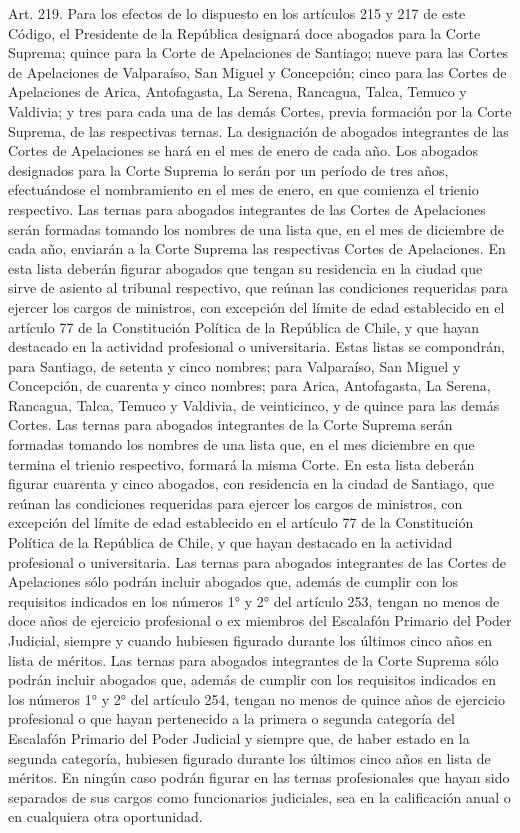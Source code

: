     Art. 219. Para los efectos de lo dispuesto en los artículos 215 y 217 de este Código, el Presidente de la República designará doce abogados para la Corte Suprema; quince para la Corte de Apelaciones de Santiago; nueve para las Cortes de Apelaciones de Valparaíso, San Miguel y Concepción; cinco para las Cortes de Apelaciones de Arica, Antofagasta, La Serena, Rancagua, Talca, Temuco y Valdivia; y tres para cada una de las demás Cortes, previa formación por la Corte Suprema, de las respectivas ternas.
    La designación de abogados integrantes de las Cortes de Apelaciones se hará en el mes de enero de cada año. Los abogados designados para la Corte Suprema lo serán por un período de tres años, efectuándose el nombramiento en el mes de enero, en que comienza el trienio respectivo.
    Las ternas para abogados integrantes de las Cortes de Apelaciones serán formadas tomando los nombres de una lista que, en el mes de diciembre de cada año, enviarán a la Corte Suprema las respectivas Cortes de Apelaciones. En esta lista deberán figurar abogados que tengan su residencia en la ciudad que sirve de asiento al tribunal respectivo, que reúnan las condiciones requeridas para ejercer los cargos de ministros, con excepción del límite de edad establecido en el artículo 77 de la Constitución Política de la República de Chile, y que hayan destacado en la actividad profesional o universitaria.
    Estas listas se compondrán, para Santiago, de setenta y cinco nombres; para Valparaíso, San Miguel y Concepción, de cuarenta y cinco nombres; para Arica, Antofagasta, La Serena, Rancagua, Talca, Temuco y Valdivia, de veinticinco, y de quince para las demás Cortes.
    Las ternas para abogados integrantes de la Corte Suprema serán formadas tomando los nombres de una lista que, en el mes diciembre en que termina el trienio respectivo, formará la misma Corte. En esta lista deberán figurar cuarenta y cinco abogados, con residencia en la ciudad de Santiago, que reúnan las condiciones requeridas para ejercer los cargos de ministros, con excepción del límite de edad establecido en el artículo 77 de la Constitución Política de la República de Chile, y que hayan destacado en la actividad profesional o universitaria.
    Las ternas para abogados integrantes de las Cortes de Apelaciones sólo podrán incluir abogados que, además de cumplir con los requisitos indicados en los números 1° y 2° del artículo 253, tengan no menos de doce años de ejercicio profesional o ex miembros del Escalafón Primario del Poder Judicial, siempre y cuando hubiesen figurado durante los últimos cinco años en lista de méritos. Las ternas para abogados integrantes de la Corte Suprema sólo podrán incluir abogados que, además de cumplir con los requisitos indicados en los números 1° y 2° del artículo 254, tengan no menos de quince años de ejercicio profesional o que hayan pertenecido a la primera o segunda categoría del Escalafón Primario del Poder Judicial y siempre que, de haber estado en la segunda categoría, hubiesen figurado durante los últimos cinco años en lista de méritos. En ningún caso podrán figurar en las ternas profesionales que hayan sido separados de sus cargos como funcionarios judiciales, sea en la calificación anual o en cualquiera otra oportunidad.
